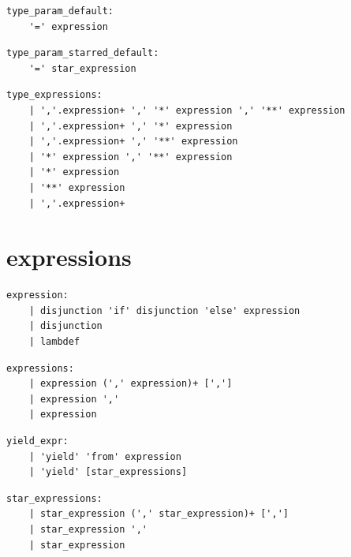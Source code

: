\noindent\textbf{\texttt{}}\par
\begin{lstlisting}
type_param_default:
    '=' expression
\end{lstlisting}

\noindent\textbf{\texttt{}}\par
\begin{lstlisting}
type_param_starred_default:
    '=' star_expression
\end{lstlisting}

\noindent\textbf{\texttt{}}\par
\begin{lstlisting}
type_expressions:
    | ','.expression+ ',' '*' expression ',' '**' expression
    | ','.expression+ ',' '*' expression
    | ','.expression+ ',' '**' expression
    | '*' expression ',' '**' expression
    | '*' expression
    | '**' expression
    | ','.expression+
\end{lstlisting}

\section{expressions}

\noindent\textbf{\texttt{}}\par
\begin{lstlisting}
expression:
    | disjunction 'if' disjunction 'else' expression
    | disjunction
    | lambdef
\end{lstlisting}

\noindent\textbf{\texttt{}}\par
\begin{lstlisting}
expressions:
    | expression (',' expression)+ [',']
    | expression ','
    | expression
\end{lstlisting}

\noindent\textbf{\texttt{}}\par
\begin{lstlisting}
yield_expr:
    | 'yield' 'from' expression
    | 'yield' [star_expressions]
\end{lstlisting}

\noindent\textbf{\texttt{}}\par
\begin{lstlisting}
star_expressions:
    | star_expression (',' star_expression)+ [',']
    | star_expression ','
    | star_expression
\end{lstlisting}

